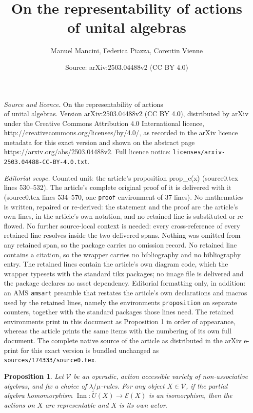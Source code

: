\documentclass[10pt,a4paper]{amsart}
\title{On the representability of actions\\of unital algebras}
\author{Manuel Mancini, Federica Piazza, Corentin Vienne}
\date{Source: arXiv:2503.04488v2 (CC BY 4.0)}
\newtheorem{proposition}{Proposition}
\newcommand{\E}{\mathcal{E}}
\DeclareMathOperator{\Inn}{Inn}
\newcommand{\V}{\mathcal{V}}
\begin{document}
\maketitle

\noindent\emph{Source and licence.} On the representability of actions\\of unital algebras. Version arXiv:2503.04488v2 (CC BY 4.0), distributed by arXiv under the Creative Commons Attribution 4.0 International licence, http://creativecommons.org/licenses/by/4.0/, as recorded in the arXiv licence metadata for this exact version and shown on the abstract page https://arxiv.org/abs/2503.04488v2. Full licence notice: \texttt{licenses/arxiv-2503.04488-CC-BY-4.0.txt}.\par\smallskip

\noindent\textit{Editorial scope.} Counted unit: the article's proposition prop\_e(x) (source0.tex lines 530--532). The article's complete original proof of it is delivered with it (source0.tex lines 534--570, one \texttt{proof} environment of 37 lines). No mathematics is written, repaired or re-derived: the statement and the proof are the article's own lines, in the article's own notation, and no retained line is substituted or re-flowed.  No further source-local context is needed: every cross-reference of every retained line resolves inside the two delivered spans.  Nothing was omitted from any retained span, so the package carries no omission record.  No retained line contains a citation, so the wrapper carries no bibliography and no bibliography entry.  The retained lines contain the article's own diagram code, which the wrapper typesets with the standard tikz packages; no image file is delivered and the package declares no asset dependency.  Editorial formatting only, in addition: an AMS \texttt{amsart} preamble that restates the article's own declarations and macros used by the retained lines, namely the environments \texttt{proposition} on separate counters, together with the standard packages those lines need.  The retained environments print in this document as Proposition 1 in order of appearance, whereas the article prints the same items with the numbering of its own full document.  The complete native source of the article as distributed in the arXiv e-print for this exact version is bundled unchanged as \texttt{sources/174333/source0.tex}.
\begin{proposition}\label{prop_e(x)}
Let $\V$ be an operadic, action accessible variety of non-associative algebras, and fix a choice of $\lambda/\mu$-rules. For any object $X \in \V$, if the partial algebra homomorphism $\Inn \colon \widetilde{U}(X) \to \E(X)$ is an isomorphism, then the actions on $X$ are representable and $X$ is its own actor.
\end{proposition}
\end{document}
